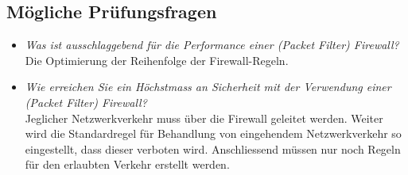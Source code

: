 \subsection*{Mögliche Prüfungsfragen}
\begin{itemize}
	\item \emph{Was ist ausschlaggebend für die Performance einer (Packet Filter) Firewall?}\\
	Die Optimierung der Reihenfolge der Firewall-Regeln.
	\item \emph{Wie erreichen Sie ein Höchstmass an Sicherheit mit der Verwendung einer (Packet Filter) Firewall?}\\
	Jeglicher Netzwerkverkehr muss über die Firewall geleitet werden. Weiter wird die Standardregel für Behandlung von eingehendem Netzwerkverkehr so eingestellt, dass dieser verboten wird. Anschliessend müssen nur noch Regeln für den erlaubten Verkehr erstellt werden.
\end{itemize}